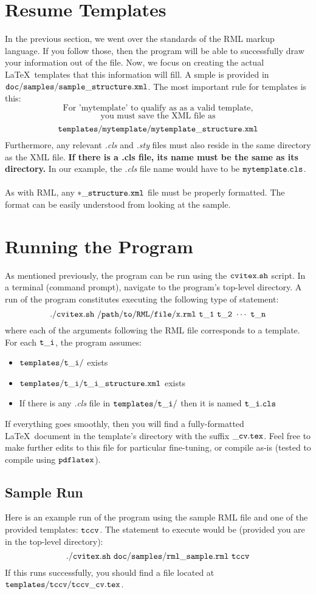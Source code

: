 \documentclass[12pt]{article}
\begin{document}
\section*{Resume Templates}
In the previous section, we went over the standards of the RML
markup language. If you follow those, then the program will be able
to successfully draw your information out of the file. Now, we focus
on creating the actual \LaTeX\ templates that this information will
fill. A smple is provided in $\tt{doc/samples/sample\_structure.xml}$.
The most important rule for templates is this:
$$\text{For 'mytemplate' to qualify as as a valid template,}$$
$$\text{you must save the XML file as}$$
$$\tt{templates/mytemplate/mytemplate\_structure.xml}$$
Furthermore, any relevant \textit{.cls} and \textit{.sty} files must also
reside in the same directory as the XML file. \textbf{If there is a .cls file, its name must be the same as its directory.}
In our example, the \textit{.cls} file name would have to be $\tt{mytemplate.cls}$.\\ \\
As with RML, any $\tt{*\_structure.xml}$ file must be properly formatted.
The format can be easily understood from looking at the sample.
\section*{Running the Program}
As mentioned previously, the program can be run using the $\tt{cvitex.sh}$ script. In a terminal (command prompt), navigate to the program's
top-level directory. A run of the program constitutes executing the
following type of statement:
$$\tt{./cvitex.sh\ /path/to/RML/file/x.rml\ t\_1\ t\_2\ \cdots\ t\_n}$$
where each of the arguments following the RML file corresponds to a
template. For each $\tt{t\_i}$, the program assumes:
\begin{itemize}
\item $\tt{templates/t\_i/}$ exists
\item $\tt{templates/t\_i/t\_i\_structure.xml}$ exists
\item If there is any \textit{.cls} file in $\tt{templates/t\_i/}$
      then it is named $\tt{t\_i.cls}$
\end{itemize}
If everything goes smoothly, then you will find a fully-formatted
\LaTeX\ document in the template's directory with the suffix
$\tt{\_cv.tex}$. Feel free to make further edits to this file for
particular fine-tuning, or compile as-is (tested to compile using
$\tt{pdflatex}$).
\subsection*{Sample Run}
Here is an example run of the program using the sample RML file
and one of the provided templates: $\tt{tccv}$. The statement
to execute would be (provided you are in the top-level directory):
$$\tt{./cvitex.sh\ doc/samples/rml\_sample.rml\ tccv}$$
If this runs successfully, you should find a file located at
$\tt{templates/tccv/tccv\_cv.tex}$.
\end{document}
